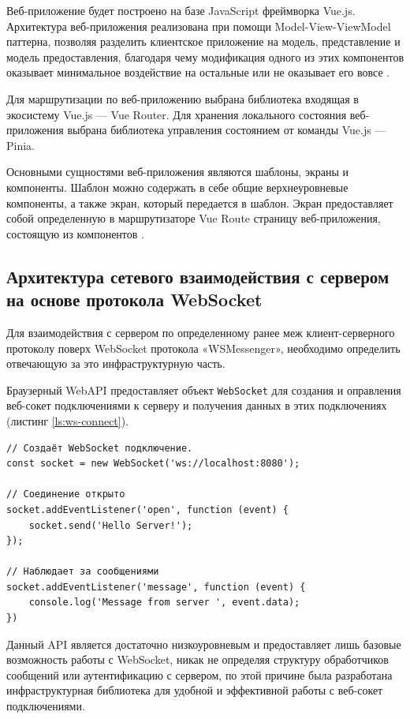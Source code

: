 Веб-приложение будет построено на базе JavaScript фреймворка Vue.js. Архитектура веб-приложения реализована при помощи Model-View-ViewModel паттерна, позволяя разделить клиентское приложение на модель, представление и модель предоставления, благодаря чему модификация одного из этих компонентов оказывает минимальное воздействие на остальные или не оказывает его вовсе \cite{vuelayout}.

Для маршрутизации по веб-приложению выбрана библиотека входящая в экосистему Vue.js — Vue Router. Для хранения локального состояния веб-приложения выбрана библиотека управления состоянием от команды Vue.js — Pinia.

Основными сущностями веб-приложения являются шаблоны, экраны и компоненты. Шаблон можно содержать в себе общие верхнеуровневые компоненты, а также экран, который передается в шаблон. Экран предоставляет собой определенную в маршрутизаторе Vue Route страницу веб-приложения, состоящую из компонентов \cite{vuejsrouter}.

\subsection{Архитектура сетевого взаимодействия с сервером на основе протокола WebSocket}

Для взаимодействия с сервером по определенному ранее меж клиент-серверного протоколу поверх WebSocket протокола «WSMessenger», необходимо определить отвечающую за это инфраструктурную часть.

Браузерный WebAPI предоставляет объект \verb|WebSocket| для создания и оправления веб-сокет подключениями к серверу и получения данных в этих подключениях (листинг \ref{ls:ws-connect}).

\begin{lstlisting}[caption={Подключение к WebSocket серверу при помощи WebSockt API}, label={ls:ws-connect}]
// Создаёт WebSocket подключение.
const socket = new WebSocket('ws://localhost:8080');

// Соединение открыто
socket.addEventListener('open', function (event) {
    socket.send('Hello Server!');
});

// Наблюдает за сообщениями
socket.addEventListener('message', function (event) {
    console.log('Message from server ', event.data);
})
\end{lstlisting}

Данный API является достаточно низкоуровневым и предоставляет лишь базовые возможность работы с WebSocket, никак не определяя структуру обработчиков сообщений или аутентификацию с сервером, по этой причине была разработана инфраструктурная библиотека для удобной и эффективной работы с веб-сокет подключениями.

